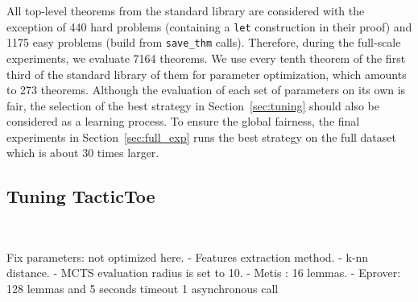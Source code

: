 \documentclass[runningheads,a4paper,draft]{svjour3}
\def\tactictoe{\textsf{TacticToe}\xspace}
\begin{document}
All top-level theorems from the standard library are considered with the 
exception of 440 hard problems (containing a \texttt{let} construction in their 
proof) and 1175 easy problems (build from \texttt{save\_thm} calls). 
Therefore, during the full-scale experiments, we evaluate 7164 theorems.
We use every tenth theorem of the first third of the standard library of 
them for parameter optimization, which amounts to 273 theorems.
Although the evaluation of each set of parameters on its own is fair, 
the selection of the best strategy in Section~\ref{sec:tuning} should also be 
considered as a learning process. To ensure the global fairness, the final 
experiments in Section~\ref{sec:full_exp} runs the best strategy on the full 
dataset which is about 30 times larger.

\subsection{Tuning \tactictoe}~\label{sec:tuning}

Fix parameters: not optimized here. 
 - Features extraction method.
 - k-nn distance.
 - MCTS evaluation radius is set to 10. 
 - Metis : 16 lemmas.
 - Eprover: 128 lemmas and 5 seconds timeout 1 asynchronous call
\end{document}
